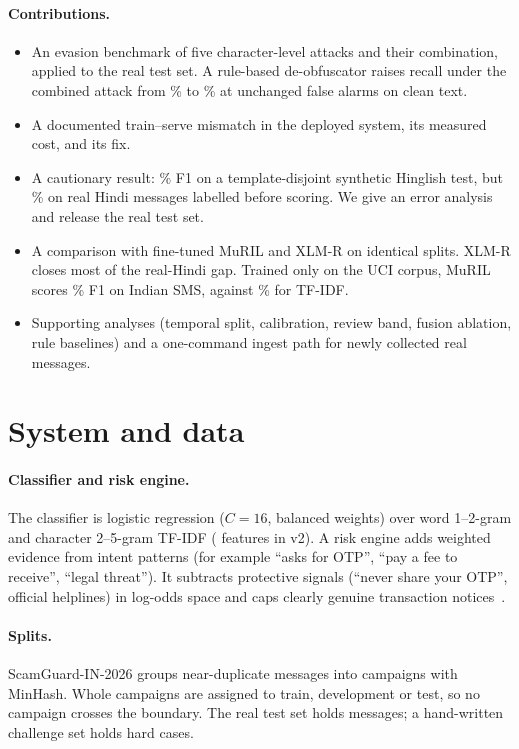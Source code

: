 \documentclass[10pt,twocolumn]{article}
\begin{document}
\paragraph{Contributions.}
\begin{itemize}\itemsep0pt
\item An evasion benchmark of five character-level attacks and their combination, applied to the real test set.
  A rule-based de-obfuscator raises recall under the combined attack from \recComboOne\% to \recComboTwo\% at
  unchanged false alarms on clean text.
\item A documented train--serve mismatch in the deployed system, its measured cost, and its fix.
\item A cautionary result: \fHinBTwo\% F1 on a template-disjoint synthetic Hinglish test, but \fRHTwo\% on real Hindi
  messages labelled before scoring. We give an error analysis and release the real test set.
\item A comparison with fine-tuned MuRIL and XLM-R on identical splits. XLM-R closes most of the real-Hindi gap.
  Trained only on the UCI corpus, MuRIL scores \tMuCrossFull\% F1 on Indian SMS, against \tLrCrossFull\% for TF-IDF.
\item Supporting analyses (temporal split, calibration, review band, fusion ablation, rule baselines) and a one-command
  ingest path for newly collected real messages.
\end{itemize}

\section{System and data}
\paragraph{Classifier and risk engine.} The classifier is logistic regression ($C=16$, balanced weights) over word
1--2-gram and character 2--5-gram TF-IDF (\vocabTwo{} features in v2). A risk engine adds weighted evidence from
intent patterns (for example ``asks for OTP'', ``pay a fee to receive'', ``legal threat''). It subtracts protective
signals (``never share your OTP'', official helplines) in log-odds space and caps clearly genuine transaction
notices~\cite{scamguard1}.

\paragraph{Splits.} ScamGuard-IN-2026 groups near-duplicate messages into campaigns with MinHash. Whole campaigns are
assigned to train, development or test, so no campaign crosses the boundary. The real test set holds \nReal{}
messages; a hand-written challenge set holds \nChal{} hard cases.
\end{document}
